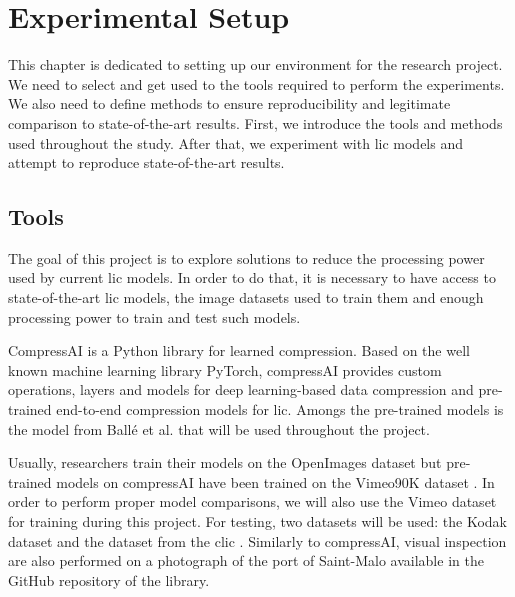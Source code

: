 \chapter{Experimental Setup}
\label{part_1}
This chapter is dedicated to setting up our environment for the research project. We need to select and get used to the tools required to perform the experiments. We also need to define methods to ensure reproducibility and legitimate comparison to state-of-the-art results. First, we introduce the tools and methods used throughout the study. After that, we experiment with \acrshort{lic} models and attempt to reproduce state-of-the-art results.

\section{Tools}
The goal of this project is to explore solutions to reduce the processing power used by current \acrshort{lic} models. In order to do that, it is necessary to have access to state-of-the-art \acrshort{lic} models, the image datasets used to train them and enough processing power to train and test such models.

CompressAI \cite{compressai} is a Python library for learned compression. Based on the well known machine learning library PyTorch, compressAI provides custom operations, layers and models for deep learning-based data compression and pre-trained end-to-end compression models for \acrshort{lic}. Amongs the pre-trained models is the model from Ballé et al. \cite{ballé2018variationalimagecompressionscale} that will be used throughout the project.

Usually, researchers train their models on the OpenImages dataset \cite{openimages} but pre-trained models on compressAI have been trained on the Vimeo90K dataset \cite{xue2019video}. In order to perform proper model comparisons, we will also use the Vimeo dataset for training during this project. For testing, two datasets will be used: the Kodak dataset \cite{kodak} and the dataset from the \acrfull{clic} \cite{clic}. Similarly to compressAI, visual inspection are also performed on a photograph of the port of Saint-Malo available in the GitHub repository of the library.

